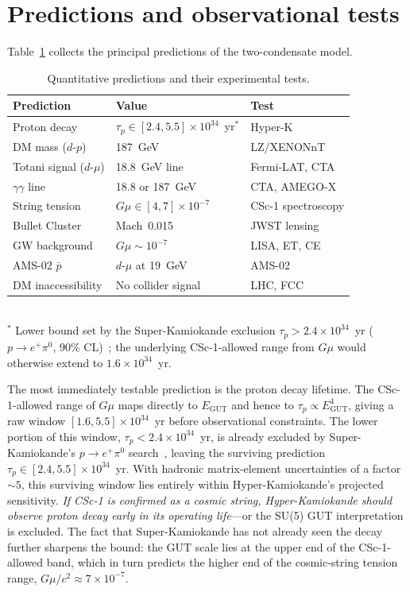 \documentclass[11pt]{article}
\begin{document}
\section{Predictions and observational tests}
\label{sec:predictions}

Table~\ref{tab:predictions} collects the principal predictions of the two-condensate model.

\begin{table}[h]
\centering
\caption{Quantitative predictions and their experimental tests.}
\label{tab:predictions}
\begin{tabular}{@{}p{3.2cm}p{2.5cm}p{2.0cm}@{}}
\toprule
\textbf{Prediction} & \textbf{Value} & \textbf{Test} \\
\midrule
Proton decay & $\tau_p \in [2.4, 5.5]\times 10^{34}$~yr$^{*}$ & Hyper-K \\
DM mass ($d$-$p$) & 187~GeV & LZ/XENONnT \\
Totani signal ($d$-$\mu$) & 18.8~GeV line & Fermi-LAT, CTA \\
$\gamma\gamma$ line & 18.8 or 187~GeV & CTA, AMEGO-X \\
String tension & $G\mu \in [4,7]\times 10^{-7}$ & CSc-1 spectroscopy \\
Bullet Cluster & Mach~0.015 & JWST lensing \\
GW background & $G\mu \sim 10^{-7}$ & LISA, ET, CE \\
AMS-02 $\bar{p}$ & $d$-$\mu$ at 19~GeV & AMS-02 \\
DM inaccessibility & No collider signal & LHC, FCC \\
\bottomrule
\end{tabular}\\[2pt]
\footnotesize $^{*}$ Lower bound set by the Super-Kamiokande exclusion $\tau_p > 2.4 \times 10^{34}$~yr ($p \to e^+ \pi^0$, 90\% CL)~\cite{SuperK2020}; the underlying CSc-1-allowed range from $G\mu$ would otherwise extend to $1.6 \times 10^{34}$~yr.
\end{table}

The most immediately testable prediction is the proton decay lifetime.
The CSc-1-allowed range of $G\mu$ maps directly to $E_\text{GUT}$ and hence to $\tau_p \propto E_\text{GUT}^4$, giving a raw window $[1.6, 5.5] \times 10^{34}$~yr before observational constraints.
The lower portion of this window, $\tau_p < 2.4 \times 10^{34}$~yr, is already excluded by Super-Kamiokande's $p \to e^+ \pi^0$ search~\cite{SuperK2020}, leaving the surviving prediction $\tau_p \in [2.4, 5.5] \times 10^{34}$~yr.
With hadronic matrix-element uncertainties of a factor $\sim 5$, this surviving window lies entirely within Hyper-Kamiokande's projected sensitivity.
\emph{If CSc-1 is confirmed as a cosmic string, Hyper-Kamiokande should observe proton decay early in its operating life}---or the SU(5) GUT interpretation is excluded.
The fact that Super-Kamiokande has not already seen the decay further sharpens the bound: the GUT scale lies at the upper end of the CSc-1-allowed band, which in turn predicts the higher end of the cosmic-string tension range, $G\mu/c^2 \approx 7 \times 10^{-7}$.
\end{document}
